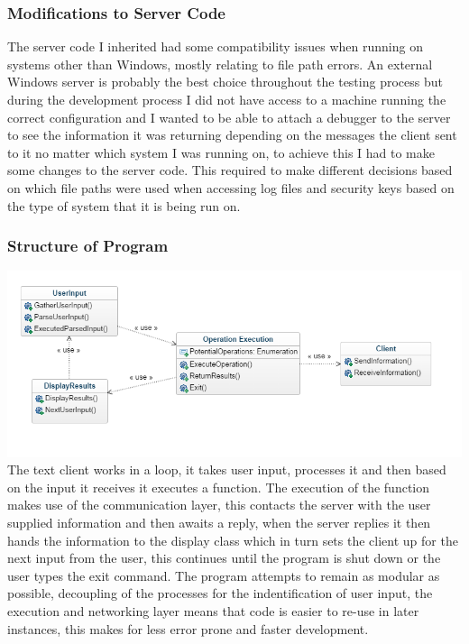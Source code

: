 \documentclass{article}
\begin{document}
\subsubsection{Modifications to Server Code}
The server code I inherited had some compatibility issues when running on systems other than Windows, mostly relating to file path errors. An external Windows server is probably the best choice throughout the testing process but during the development process I did not have access to a machine running the correct configuration and I wanted to be able to attach a debugger to the server to see the information it was returning depending on the messages the client sent to it no matter which system I was running on, to achieve this I had to make some changes to the server code. This required to make different decisions based on which file paths were used when accessing log files and security keys based on the type of system that it is being run on.
\subsubsection{Structure of Program}
\includegraphics[width=\textwidth]{textclient.png}\\
 The text client works in a loop, it takes user input, processes it and then based on the input it receives it executes a function. The execution of the function makes use of the communication layer, this contacts the server with the user supplied information and then awaits a reply, when the server replies it then hands the information to the display class which in turn sets the client up for the next input from the user, this continues until the program is shut down or the user types the exit command. The program attempts to remain as modular as possible, decoupling of the processes for the indentification of user input, the execution and networking layer means that code is easier to re-use in later instances, this makes for less error prone and faster development.
\end{document}

